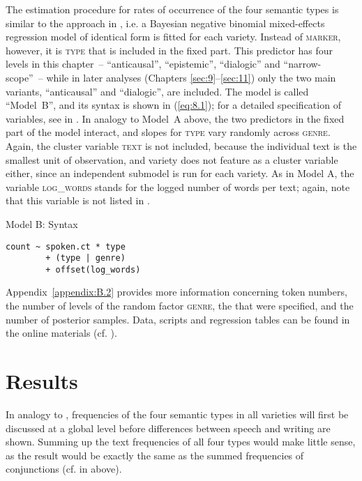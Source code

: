 The estimation procedure for rates of occurrence of the four semantic types is similar to the approach in , i.e. a Bayesian negative binomial mixed-effects regression model of identical form is fitted for each variety. Instead of \textsc{marker}, however, it is \textsc{type} that is included in the fixed part. This predictor has four levels in this chapter~– “anticausal”, “epistemic”, “dialogic” and “narrow-scope”~– while in later analyses (Chapters \ref{sec:9}–\ref{sec:11}) only the two main variants, “anticausal” and “dialogic”, are included. The model is called “Model~B”, and its syntax is shown in (\ref{eq:8.1});  for a detailed specification of variables, see  in . In analogy to Model~A above, the two predictors in the fixed part of the model interact, and slopes for \textsc{type} vary randomly across \textsc{genre}. Again, the cluster variable \textsc{text} is not included, because the individual text is the smallest unit of observation, and variety does not feature as a cluster variable either, since an independent submodel is run for each variety. As in Model A, the variable \textsc{log\_words} stands for the logged number of words per text; again, note that this variable is not listed in .

\ea
\label{bkm:Ref41326003}\label{eq:8.1}Model B: Syntax
\begin{lstlisting}
count ~ spoken.ct * type
        + (type | genre)
        + offset(log_words)
\end{lstlisting}
\z

Appendix~\ref{appendix:B.2} provides more information concerning token numbers, the number of levels of the random factor \textsc{genre}, the  that were specified, and the number of posterior samples. Data, scripts and regression tables can be found in the online materials (cf. ).

\section{\label{bkm:Ref52538360}Results}\label{sec:8.2}

In analogy to , frequencies of the four semantic types in all varieties will first be discussed at a global level before differences between speech and writing are shown. Summing up the text frequencies of all four types would make little sense, as the result would be exactly the same as the summed frequencies of conjunctions (cf.  in  above).

